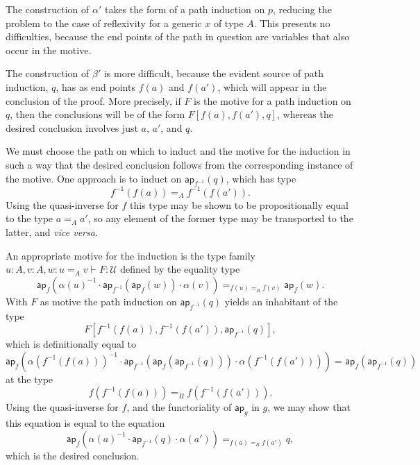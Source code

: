 \documentclass{article}
\newcommand{\idty}[3]{{#2}\mathbin{=_{#1}}{#3}}
\newcommand{\app}[2]{{#1}({#2})}
\newcommand{\pa}[1]{\mathsf{ap}_{#1}}
\newcommand{\univty}{\mathcal{U}}
\newcommand{\iv}[1]{#1^{-1}}
\newcommand{\concat}[2]{{#1}\cdot{#2}}
\begin{document}
The construction of $\alpha'$ takes the form of a path induction on $p$,
reducing the problem to the case of reflexivity for a generic $x$ of type $A$.
This presents no difficulties, because the end points of the path in question
are variables that also occur in the motive.

The construction of $\beta'$ is more difficult, because the evident source of
path induction, $q$, has as end points $\app{f}{a}$ and $\app{f}{a'}$, which
will appear in the conclusion of the proof.  More precisely, if $F$ is the
motive for a path induction on $q$, then the conclusions will be of the form
$F[\app{f}{a},\app{f}{a'},q]$, whereas the desired conclusion involves just $a$,
$a'$, and $q$.

We must choose the path on which to induct and the motive for the induction in
such a way that the desired conclusion follows from the corresponding instance
of the motive.  One approach is to induct on $\app{\pa{\iv{f}}}{q}$, which
has type
$$\idty{A}{\app{\iv{f}}{\app{f}{a}}}{\app{\iv{f}}{\app{f}{a'}}}.$$
Using the quasi-inverse for $f$ this type may be shown to be propositionally
equal to the type $\idty{A}{a}{a'}$, so any element of the former type may be
transported to the latter, and \textit{vice versa}.

An appropriate motive for the induction is the type family
$u{:}A,v{:}A,w{:}\idty{A}{u}{v}\vdash F:\univty$ defined by the equality type
\begin{displaymath}
  \idty{\idty{B}{\app{f}{u}}{\app{f}{v}}}{\app{\pa{f}}{\concat{\concat{\iv{\app{\alpha}{u}}}{\app{\pa{\iv{f}}}{\app{\pa{f}}{w}}}}{\app{\alpha}{v}}}}{\app{\pa{f}}{w}}.
\end{displaymath}
With $F$ as motive the path induction on $\app{\pa{\iv{f}}}{q}$ yields an inhabitant
of the type
$${F[\app{\iv{f}}{\app{f}{a}},\app{\iv{f}}{\app{f}{a'}},\app{\pa{\iv{f}}}{q}]},$$
which is definitionally equal to
\begin{displaymath}
  \idty{}
  {\app{\pa{f}}
    {\concat
      {\concat
        {\iv{\app{\alpha}{\app{\iv{f}}{\app{f}{a}}}}}
        {\app{\pa{\iv{f}}}{\app{\pa{f}}{\app{\pa{\iv{f}}}{q}}}}
      }
      {\app{\alpha}{\app{\iv{f}}{\app{f}{a'}}}}
    }
  }
  {\app{\pa{f}}{\app{\pa{\iv{f}}}{q}}}
\end{displaymath}
at the type
\begin{displaymath}
  \idty{B}{\app{f}{\app{\iv{f}}{\app{f}{a}}}}{\app{f}{\app{\iv{f}}{\app{f}{a'}}}}.
\end{displaymath}
Using the quasi-inverse for $f$, and the functoriality of $\pa{g}$ in $g$, we
may show that this equation is equal to the equation
\begin{displaymath}
  \idty
  {\idty{B}{\app{f}{a}}{\app{f}{a'}}}
  {\app{\pa{f}}
      {\concat
        {\concat
          {\iv{\app{\alpha}{{a}}}}
          {\app{\pa{\iv{f}}}{q}}
        }
        {\app{\alpha}{a'}}
      }
    }
    {q},
\end{displaymath}
which is the desired conclusion.
\end{document}
